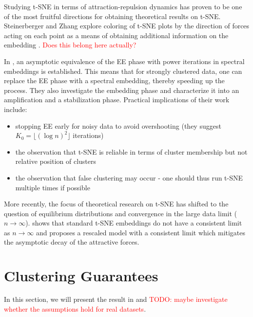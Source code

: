 Studying t-SNE in terms of attraction-repulsion dynamics has proven to be one of the most fruitful directions for obtaining theoretical results on t-SNE. 
Steinerberger and Zhang explore coloring of t-SNE plots by the direction of forces acting on each point as a means of obtaining additional information on the embedding \cite{SteiZhang22}. \textcolor{red}{Does this belong here actually?}

In \cite{Cai22}, an asymptotic equivalence of the EE phase with power iterations in spectral embeddings is established. 
This means that for strongly clustered data, one can replace the EE phase with a spectral embedding, thereby speeding up the process. 
They also investigate the embedding phase and characterize it into an amplification and a stabilization phase. 
Practical implications of their work include: 
\begin{itemize}
    \item stopping EE early for noisy data to avoid overshooting (they suggest $K_0 = \lfloor (\log n)^2 \rfloor$ iterations)
    \item the observation that t-SNE is reliable in terms of cluster membership but not relative position of clusters 
    \item the observation that false clustering may occur - one should thus run t-SNE multiple times if possible
\end{itemize}
More recently, the focus of theoretical research on t-SNE has shifted to the question of equilibrium distributions and convergence in the large data limit ($n \to \infty$). 
\cite{murray2024largedatalimitsscaling} shows that standard t-SNE embeddings do not have a consistent limit as $n \to \infty$ and proposes a rescaled model with a consistent limit which mitigates the asymptotic decay of the attractive forces. 

\section{Clustering Guarantees}
In this section, we will present the result in \cite{LinStei22} and \textcolor{red}{TODO: maybe investigate whether the assumptions hold for real datasets}. 


